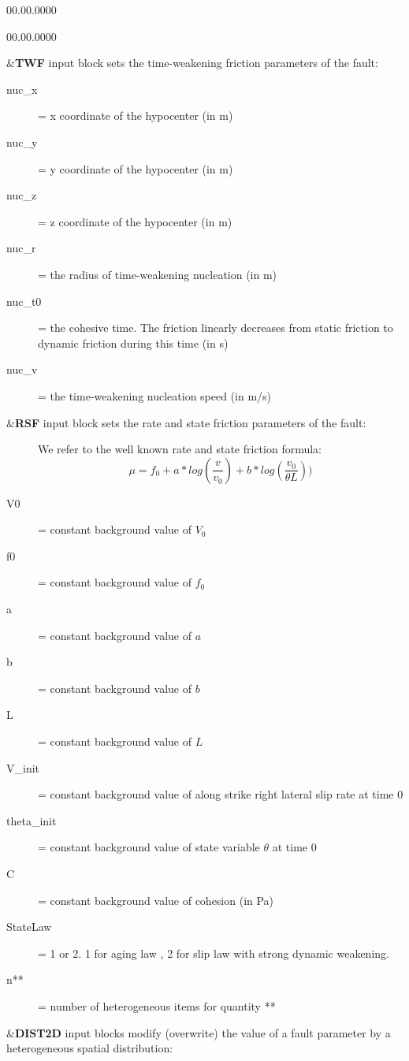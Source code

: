 \begin{lyxlist}{00.00.0000}
\begin{lyxlist}{00.00.0000}
\item [{\&\textbf{TWF}}] input block sets the time-weakening friction parameters
of the fault:
\begin{description}
\item [{nuc\_x}]  = x coordinate of the hypocenter (in m)
\item [{nuc\_y}]  = y coordinate of the hypocenter (in m)
\item [{nuc\_z}]  = z coordinate of the hypocenter (in m)
\item [{nuc\_r}]  = the radius of time-weakening nucleation (in m) 
\item [{nuc\_t0}] = the cohesive time. The friction linearly decreases from static friction to dynamic friction during this time (in s)
\item [{nuc\_v}]  = the time-weakening nucleation speed (in m/s)
\end{description}


\item [{\&\textbf{RSF}}] input block sets the rate and state friction parameters
of the fault:
\begin{description}
  \item []
    We refer to the well known rate and state friction formula:
    $$\mu = f_0 + a* log(\frac{v}{v_0}) + b* log(\frac{v_0}{\theta L}))  $$
\item [{V0}] = constant background value of $V_0$
\item [{f0}] = constant background value of $f_0$
\item [{a}] = constant background value of $a$
\item [{b}] = constant background value of $b$
\item [{L}] = constant background value of $L$
\item [{V\_init}] = constant background value of along strike right lateral slip rate at time 0
\item [{theta\_init}] = constant background value of state variable $\theta$ at time 0
\item [{C}] = constant background value of cohesion (in Pa)
\item [{StateLaw}] = 1 or 2. 1 for aging law , 2 for slip law with strong dynamic weakening.
\item [{n**}] = number of heterogeneous items for quantity **
\end{description}

\item [{\&\textbf{DIST2D}}] input blocks modify (overwrite) the value of
a fault parameter by a heterogeneous spatial distribution:


\end{lyxlist}
\end{lyxlist}
